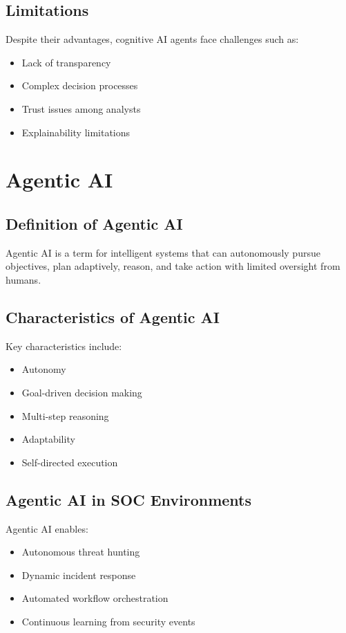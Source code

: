 \documentclass[12pt,a4paper]{report}
\begin{document}
\subsection{Limitations}
Despite their advantages, cognitive AI agents face challenges such as:
\begin{itemize}
    \item Lack of transparency
    \item Complex decision processes
    \item Trust issues among analysts
    \item Explainability limitations
\end{itemize}

\section{Agentic AI}
\label{sec:agentic_ai}

\subsection{Definition of Agentic AI}
Agentic AI is a term for intelligent systems that can autonomously pursue objectives, plan adaptively, reason, and take action with limited oversight from humans.

\subsection{Characteristics of Agentic AI}
Key characteristics include:
\begin{itemize}
    \item Autonomy
    \item Goal-driven decision making
    \item Multi-step reasoning
    \item Adaptability
    \item Self-directed execution
\end{itemize}

\subsection{Agentic AI in SOC Environments}
Agentic AI enables:
\begin{itemize}
    \item Autonomous threat hunting
    \item Dynamic incident response
    \item Automated workflow orchestration
    \item Continuous learning from security events
\end{itemize}
\end{document}
